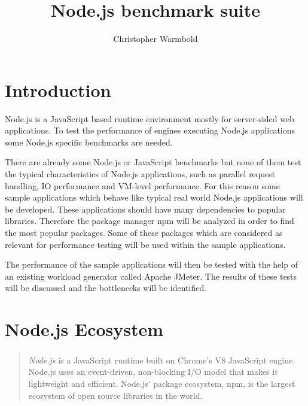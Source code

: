 \newcommand\TODO[1]{\mynote{TODO}{0,0,255}{#1}}
\newcommand\cw[1]{\mynote{Christopher C}{255,0,0}{#1}}

\author{Christopher Warmbold}
\title{Node.js benchmark suite}










\tableofcontents



\newpage
{}

\chapter{Introduction}

Node.js is a JavaScript based runtime environment mostly for server-sided web applications. To test the performance of engines executing Node.js applications some Node.js specific benchmarks are needed.

There are already some Node.js or JavaScript benchmarks but none of them test the typical characteristics of Node.js applications, such as parallel request handling, IO performance and VM-level performance.
For this reason some sample applications which behave like typical real world Node.js applications will be developed. These applications should have many dependencies to popular libraries. Therefore the package manager npm will be analyzed in order to find the most popular packages. Some of these packages which are considered as relevant for performance testing will be used within the sample applications.

The performance of the sample applications will then be tested with the help of an existing workload generator called Apache JMeter. The results of these tests will be discussed and the bottlenecks will be identified.


\chapter{Node.js Ecosystem}
\begin{quote}
\textit{Node.js}\textsuperscript{\textregistered} is a JavaScript runtime built on Chrome's V8 JavaScript engine. Node.js uses an event-driven, non-blocking I/O model that makes it lightweight and efficient. Node.js' package ecosystem, npm, is the largest ecosystem of open source libraries in the world.\cite{nodejs}
\end{quote}

